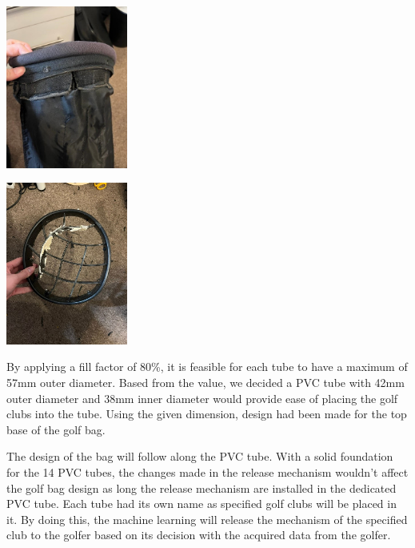 \documentclass[11pt,landscape]{article}
\newenvironment{Figure}
  {\par\medskip\noindent\minipage{\linewidth}}
  {\endminipage\par\medskip}
\begin{document}
\begin{multicols}{3}
    \begin{Figure}
        \begin{center}
            \includegraphics[width=0.3\textwidth]{Figure3.jpg}
            \label{fig:cloth}
        \end{center}
    \end{Figure}
    
    \begin{Figure}
        \begin{center}
            \includegraphics[width=0.3\textwidth]{Figure2.jpg}
            \label{fig:top}
        \end{center}
    \end{Figure}
    
    
    By applying a fill factor of 80\%, it is feasible for each tube to have a
    maximum of 57mm outer diameter. Based from the value, we decided a PVC tube
    with 42mm outer diameter and 38mm inner diameter would provide ease of
    placing the golf clubs into the tube. Using the given dimension, design had
    been made for the top base of the golf bag.
    
    The design of the bag will follow along the PVC tube. With a solid
    foundation for the 14 PVC tubes, the changes made in the release mechanism
    wouldn’t affect the golf bag design as long the release mechanism are
    installed in the dedicated PVC tube. Each tube had its own name as specified
    golf clubs will be placed in it. By doing this, the machine learning will
    release the mechanism of the specified club to the golfer based on its
    decision with the acquired data from the golfer. 
    

\end{multicols}
\end{document}
